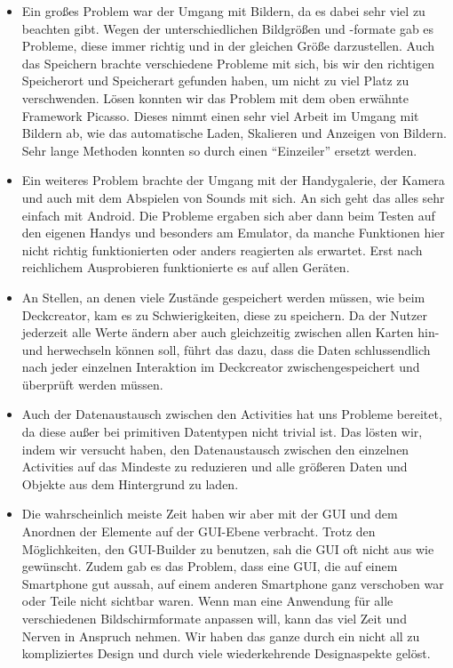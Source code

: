 \begin{itemize} 
\item Ein großes Problem war der Umgang mit Bildern, da es dabei sehr viel zu beachten gibt. Wegen der unterschiedlichen Bildgrößen und -formate gab es Probleme, diese immer richtig und in der gleichen Größe darzustellen. Auch das  Speichern brachte verschiedene Probleme mit sich, bis wir den richtigen Speicherort und Speicherart gefunden haben, um nicht zu viel Platz zu verschwenden. Lösen konnten wir das Problem mit dem oben erwähnte Framework Picasso. Dieses nimmt einen sehr viel Arbeit im Umgang mit Bildern ab, wie das automatische Laden, Skalieren und Anzeigen von Bildern. Sehr lange Methoden konnten so durch einen ``Einzeiler'' ersetzt werden.
\item Ein weiteres Problem brachte der Umgang mit der Handygalerie, der Kamera und auch mit dem Abspielen von Sounds mit sich. An sich geht das alles sehr einfach mit Android. Die Probleme ergaben sich aber dann beim Testen auf den eigenen Handys und besonders am Emulator, da manche Funktionen hier nicht richtig funktionierten oder anders reagierten als erwartet. Erst nach reichlichem Ausprobieren funktionierte es auf allen Geräten.
\item An Stellen, an denen viele Zustände gespeichert werden müssen, wie beim Deckcreator, kam es zu Schwierigkeiten, diese zu speichern. Da der Nutzer jederzeit alle Werte ändern aber auch gleichzeitig zwischen allen Karten hin- und herwechseln können soll, führt das dazu, dass die Daten schlussendlich nach jeder einzelnen Interaktion im Deckcreator zwischengespeichert und überprüft werden müssen.
\item Auch der Datenaustausch zwischen den Activities hat uns Probleme bereitet, da diese außer bei primitiven Datentypen nicht trivial ist. Das lösten wir, indem wir versucht haben, den Datenaustausch zwischen den einzelnen Activities auf das Mindeste zu reduzieren und alle größeren Daten und Objekte aus dem Hintergrund zu laden.
\item Die wahrscheinlich meiste Zeit haben wir aber mit der GUI und dem Anordnen der Elemente auf der GUI-Ebene verbracht. Trotz den Möglichkeiten, den GUI-Builder zu benutzen, sah die GUI oft nicht aus wie gewünscht. Zudem gab es das Problem, dass eine GUI, die auf einem Smartphone gut aussah, auf einem anderen Smartphone ganz verschoben war oder Teile nicht sichtbar waren. Wenn man eine Anwendung für alle verschiedenen Bildschirmformate anpassen will, kann das viel Zeit und Nerven in Anspruch nehmen. Wir haben das ganze durch ein nicht all zu kompliziertes Design und durch viele wiederkehrende Designaspekte gelöst.
\end{itemize}